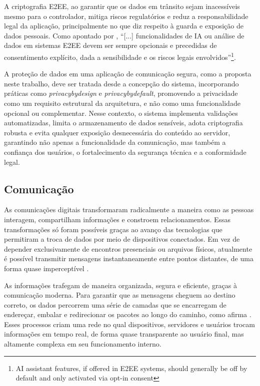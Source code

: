 A criptografia \acs{E2EE}, ao garantir que os dados em trânsito sejam
inacessíveis mesmo para o controlador, mitiga riscos regulatórios e
reduz a responsabilidade legal da aplicação, principalmente no que
diz respeito à guarda e exposição de dados pessoais. Como apontado
por , “[...]
funcionalidades de IA ou análise de
dados em sistemas \acs{E2EE} devem ser sempre opcionais e precedidas de
consentimento explícito, dada a sensibilidade e os riscos legais
envolvidos”\footnote{AI assistant features, if offered in \acs{E2EE}
  systems, should generally be off by default
and only activated via opt-in consent}.

A proteção de dados em uma aplicação de comunicação segura, como a
proposta neste trabalho, deve ser tratada desde a concepção do
sistema, incorporando práticas como \textit{\gls{privacybydesign}} e
\textit{\gls{privacybydefault}}, promovendo a privacidade como um
requisito estrutural da
arquitetura, e não como uma funcionalidade opcional ou complementar.
Nesse contexto, o sistema implementa validações automatizadas, limita
o armazenamento de dados sensíveis, adota criptografia robusta e
evita qualquer exposição desnecessária do conteúdo ao servidor,
garantindo não apenas a funcionalidade da comunicação, mas também a
confiança dos usuários, o fortalecimento da segurança técnica e a
conformidade legal.

\subsection{Comunicação}

As comunicações digitais transformaram radicalmente a maneira como as
pessoas interagem, compartilham informações e constroem
relacionamentos. Essas transformações só foram possíveis graças ao
avanço das tecnologias que permitiram a troca de dados por meio de
dispositivos conectados. Em vez de depender exclusivamente de
encontros presenciais ou arquivos físicos, atualmente é possível
transmitir mensagens instantaneamente entre pontos distantes, de uma
forma quase imperceptível .

As informações trafegam de maneira organizada, segura e eficiente,
graças à comunicação moderna. Para garantir que as mensagens cheguem
ao destino correto, os dados percorrem uma série de camadas que se
encarregam de endereçar, embalar e redirecionar os pacotes ao longo
do caminho, como afirma . Esses processos criam uma rede
no qual dispositivos, servidores e usuários trocam informações em
tempo real, de forma quase transparente ao usuário final, mas
altamente complexa em seu funcionamento interno.

